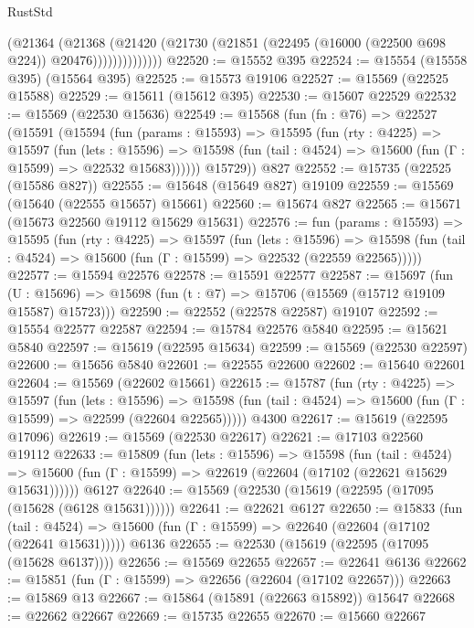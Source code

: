 \begin{lexlean}{RustStd}
\begin{coremodule}
                    (@21364
                      (@21368
                        (@21420
                          (@21730 (@21851 (@22495 (@16000 (@22500 @698 @224)) @20476))))))))))))))
@22520 := @15552 @395
@22524 := @15554 (@15558 @395) (@15564 @395)
@22525 := @15573 @19106
@22527 := @15569 (@22525 @15588)
@22529 := @15611 (@15612 @395)
@22530 := @15607 @22529
@22532 := @15569 (@22530 @15636)
@22549 := @15568
    (fun (fn : @76) =>
    @22527
      (@15591
        (@15594
          (fun (params : @15593) =>
          @15595
            (fun (rty : @4225) =>
            @15597
              (fun (lets : @15596) =>
              @15598 (fun (tail : @4524) => @15600 (fun (Γ : @15599) => @22532 @15683))))))
        @15729))
    @827
@22552 := @15735 (@22525 (@15586 @827))
@22555 := @15648 (@15649 @827) @19109
@22559 := @15569 (@15640 (@22555 @15657) @15661)
@22560 := @15674 @827
@22565 := @15671 (@15673 @22560 @19112 @15629 @15631)
@22576 := fun (params : @15593) =>
  @15595
    (fun (rty : @4225) =>
    @15597
      (fun (lets : @15596) =>
      @15598 (fun (tail : @4524) => @15600 (fun (Γ : @15599) => @22532 (@22559 @22565)))))
@22577 := @15594 @22576
@22578 := @15591 @22577
@22587 := @15697
    (fun (U : @15696) => @15698 (fun (t : @7) => @15706 (@15569 (@15712 @19109 @15587) @15723)))
@22590 := @22552 (@22578 @22587) @19107
@22592 := @15554 @22577 @22587
@22594 := @15784 @22576 @5840
@22595 := @15621 @5840
@22597 := @15619 (@22595 @15634)
@22599 := @15569 (@22530 @22597)
@22600 := @15656 @5840
@22601 := @22555 @22600
@22602 := @15640 @22601
@22604 := @15569 (@22602 @15661)
@22615 := @15787
    (fun (rty : @4225) =>
    @15597
      (fun (lets : @15596) =>
      @15598 (fun (tail : @4524) => @15600 (fun (Γ : @15599) => @22599 (@22604 @22565)))))
    @4300
@22617 := @15619 (@22595 @17096)
@22619 := @15569 (@22530 @22617)
@22621 := @17103 @22560 @19112
@22633 := @15809
    (fun (lets : @15596) =>
    @15598
      (fun (tail : @4524) =>
      @15600 (fun (Γ : @15599) => @22619 (@22604 (@17102 (@22621 @15629 @15631))))))
    @6127
@22640 := @15569 (@22530 (@15619 (@22595 (@17095 (@15628 (@6128 @15631))))))
@22641 := @22621 @6127
@22650 := @15833
    (fun (tail : @4524) => @15600 (fun (Γ : @15599) => @22640 (@22604 (@17102 (@22641 @15631)))))
    @6136
@22655 := @22530 (@15619 (@22595 (@17095 (@15628 @6137))))
@22656 := @15569 @22655
@22657 := @22641 @6136
@22662 := @15851 (fun (Γ : @15599) => @22656 (@22604 (@17102 @22657)))
@22663 := @15869 @13
@22667 := @15864 (@15891 (@22663 @15892)) @15647
@22668 := @22662 @22667
@22669 := @15735 @22655
@22670 := @15660 @22667

\end{coremodule}
\end{lexlean}
